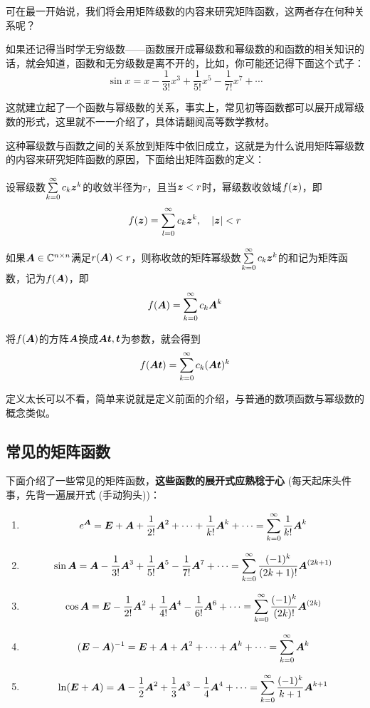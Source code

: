 \documentclass[12pt, a4paper, oneside, UTF8]{ctexbook}
\begin{document}
可在最一开始说，我们将会用矩阵级数的内容来研究矩阵函数，这两者存在何种关系呢？

如果还记得当时学无穷级数——函数展开成幂级数和幂级数的和函数的相关知识的话，就会知道，函数和无穷级数是离不开的，比如，你可能还记得下面这个式子：\[\sin x=x-\frac{1}{3!}x^3+\frac{1}{5!}x^5-\frac{1}{7!}x^7+\cdots\]

这就建立起了一个函数与幂级数的关系，事实上，常见初等函数都可以展开成幂级数的形式，这里就不一一介绍了，具体请翻阅高等数学教材。

这种幂级数与函数之间的关系放到矩阵中依旧成立，这就是为什么说用矩阵幂级数的内容来研究矩阵函数的原因，下面给出矩阵函数的定义：
\begin{defn}{}{}
    设幂级数$\sum\limits_{k=0}^{\infty}c_k\boldsymbol{z}^k$的收敛半径为$r$，且当$\boldsymbol{z}<r$时，幂级数收敛域$f(\boldsymbol{z})$，即\[f(\bs{z})=\sum_{l=0}^{\infty}c_k\bs{z}^k,\ \ \ |\bs{z}|<r\]

    如果$\boldsymbol{A}\in\mathbb{C}^{n\times n}$满足$r(\boldsymbol{A})<r$，则称收敛的矩阵幂级数$\sum\limits_{k=0}^{\infty}c_k\boldsymbol{z}^k$的和记为矩阵函数，记为$f(\boldsymbol{A})$，即\[f(\boldsymbol{A})=\sum_{k=0}^{\infty}c_k\boldsymbol{A}^k\]

    将$f(\boldsymbol{A})$的方阵$\boldsymbol{A}$换成$\boldsymbol{A}\boldsymbol{t}, \boldsymbol{t}$为参数，就会得到\[f(\boldsymbol{A}\boldsymbol{t})=\sum_{k=0}^{\infty}c_k(\boldsymbol{A}\boldsymbol{t})^k\]
\end{defn}

定义太长可以不看，简单来说就是定义前面的介绍，与普通的数项函数与幂级数的概念类似。
\subsection{常见的矩阵函数}
下面介绍了一些常见的矩阵函数，\textbf{这些函数的展开式应熟稔于心} (每天起床头件事，先背一遍展开式 (手动狗头))：
\begin{enumerate}
    \item \[e^{\boldsymbol{A}}=\boldsymbol{E}+\boldsymbol{A}+\frac{1}{2!}\boldsymbol{A}^2+\cdots+\frac{1}{k!}\boldsymbol{A}^k+\cdots=\sum_{k=0}^{\infty}\frac{1}{k!}\boldsymbol{A}^k\]
    \item \[\sin\boldsymbol{A}=\boldsymbol{A}-\frac{1}{3!}\boldsymbol{A}^3+\frac{1}{5!}\boldsymbol{A}^5-\frac{1}{7!}\boldsymbol{A}^7+\cdots=\sum_{k=0}^{\infty}\frac{(-1)^k}{(2k+1)!}\boldsymbol{A}^{(2k+1)}\]
    \item \[\cos\boldsymbol{A}=\boldsymbol{E}-\frac{1}{2!}\boldsymbol{A}^2+\frac{1}{4!}\boldsymbol{A}^4-\frac{1}{6!}\boldsymbol{A}^6+\cdots=\sum_{k=0}^{\infty}\frac{(-1)^k}{(2k)!}\boldsymbol{A}^{(2k)}\]
    \item \[(\boldsymbol{E}-\boldsymbol{A})^{-1}=\boldsymbol{E}+\boldsymbol{A}+\boldsymbol{A}^2+\cdots+\boldsymbol{A}^k+\cdots=\sum_{k=0}^{\infty}\boldsymbol{A}^k\]
    \item \[\ln(\boldsymbol{E}+\boldsymbol{A})=\boldsymbol{A}-\frac{1}{2}\boldsymbol{A}^2+\frac{1}{3}\boldsymbol{A}^3-\frac{1}{4}\boldsymbol{A}^4+\cdots=\sum_{k=0}^{\infty}\frac{(-1)^k}{k+1}\boldsymbol{A}^{k+1}\]
\end{enumerate}
\end{document}
